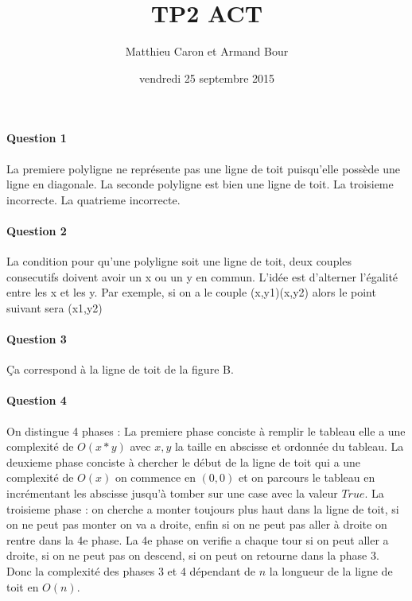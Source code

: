 \documentclass[a4paper,10pt]{article}
\title{TP2 ACT}
\author{Matthieu Caron et Armand Bour}
\date{vendredi 25 septembre 2015}
\begin{document}
\maketitle

\paragraph{Question 1}
La premiere polyligne ne représente pas une ligne de toit puisqu'elle possède une ligne en diagonale.\newline
La seconde polyligne est bien une ligne de toit.\newline
La troisieme incorrecte.\newline
La quatrieme incorrecte.\newline
\paragraph{Question 2}
La condition pour qu'une polyligne soit une ligne de toit, deux couples consecutifs doivent avoir un x ou un y en commun.
L'idée est d'alterner l'égalité entre les x et les y.
Par exemple, si on a le couple (x,y1)(x,y2) alors le point suivant sera (x1,y2) 
\paragraph{Question 3}
Ça correspond à la ligne de toit de la figure B.
\paragraph{Question 4}
On distingue 4 phases : \newline
La premiere phase conciste à remplir le tableau elle a une complexité de $O(x*y)$ avec $x,y$ la taille en abscisse et ordonnée du tableau.\newline
La deuxieme phase conciste à chercher le début de la ligne de toit qui a une complexité de $O(x)$ on commence en $(0,0)$ et 
on parcours le tableau en incrémentant les abscisse jusqu'à tomber sur une case avec la valeur $True$.
La troisieme phase : on cherche a monter toujours plus haut dans la ligne de toit, si on ne peut pas monter on va a droite, 
enfin si on ne peut pas aller à droite on rentre dans la 4e phase.
La 4e phase on verifie a chaque tour si on peut aller a droite, si on ne peut pas on descend, si on peut on retourne dans la phase 3.
Donc la complexité des phases 3 et 4 dépendant de $n$ la longueur de la ligne de toit en $O(n)$.
\end{document}
